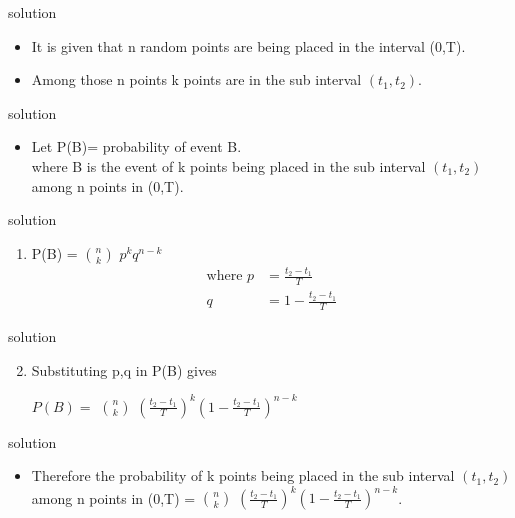 \documentclass{beamer}
\begin{document}
 \begin{frame}{solution}
 \begin{itemize}
     \item It is given that n random points are being placed in the interval (0,T).
     \item Among those n points k points are in the sub interval $(t_1,t_2)$. 
 \end{itemize}
 \end{frame}
 
 \begin{frame}{solution}
 \begin{itemize}
     \item Let P(B)= probability of event B.\\
     where B is the event of k points being placed in the sub interval $(t_1,t_2)$ among n points in (0,T). 
 \end{itemize}
 \end{frame}
 
 \begin{frame}{solution}
 \begin{enumerate}
     \item P(B)  = ${n}\choose{k}$ $p^{k}q^{n-k}$\\
         \begin{align} \text{where } p & = \frac{t_2-t_1}{T}\nonumber\\
                                     q & = 1-\frac{t_2-t_1}{T}\nonumber
              \end{align}
\end{enumerate}
 \end{frame}
 
 \begin{frame}{solution}
 \begin{enumerate}
\setcounter{enumi}{1}
\item Substituting p,q in P(B) gives \\

   \begin{center}
   $P(B) =$ ${n}\choose{k}$ $(\frac{t_2-t_1}{T})^{k}(1-\frac{t_2-t_1}{T})^{n-k}$
\end{center}
 \end{enumerate}
 \end{frame}
 
 \begin{frame}{solution}
 \begin{itemize}
     \item Therefore the probability of k points being placed in the sub interval $(t_1,t_2)$ among n points in (0,T) = ${n}\choose{k}$ $(\frac{t_2-t_1}{T})^{k}(1-\frac{t_2-t_1}{T})^{n-k}$. 
 \end{itemize}
 \end{frame}
 
 
\end{document}
